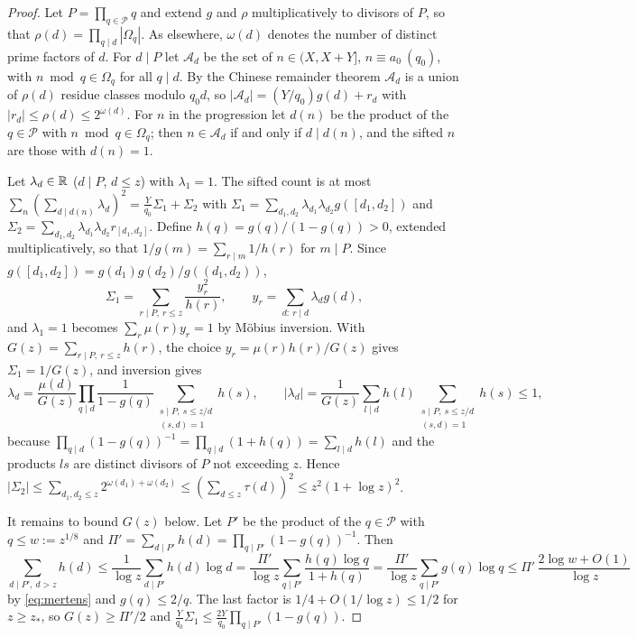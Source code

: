 \documentclass[11pt]{article}
\newcommand{\Pset}{\mathcal P}
\begin{document}
\begin{proof}
Let $P=\prod_{q\in\Pset}q$ and extend $g$ and $\rho$ multiplicatively to
divisors of $P$, so that $\rho(d)=\prod_{q\mid d}|\Omega_q|$. As elsewhere,
$\omega(d)$ denotes the number of distinct prime factors of $d$. For $d\mid P$ let $\mathcal A_d$ be the set of
$n\in(X,X+Y]$, $n\equiv a_0\ (q_0)$, with $n\bmod q\in\Omega_q$ for all $q\mid d$.
By the Chinese remainder theorem $\mathcal A_d$ is a union of $\rho(d)$
residue classes modulo $q_0d$, so $|\mathcal A_d|=(Y/q_0)g(d)+r_d$ with
$|r_d|\le\rho(d)\le2^{\omega(d)}$. For $n$ in the progression let $d(n)$ be the
product of the $q\in\Pset$ with $n\bmod q\in\Omega_q$; then $n\in\mathcal A_d$
if and only if $d\mid d(n)$, and the sifted $n$ are those with $d(n)=1$.

Let $\lambda_d\in\mathbb R$ ($d\mid P$, $d\le z$) with $\lambda_1=1$. The sifted count is
at most $\sum_n(\sum_{d\mid d(n)}\lambda_d)^2
=\frac{Y}{q_0}\Sigma_1+\Sigma_2$ with
$\Sigma_1=\sum_{d_1,d_2}\lambda_{d_1}\lambda_{d_2}g([d_1,d_2])$ and
$\Sigma_2=\sum_{d_1,d_2}\lambda_{d_1}\lambda_{d_2}r_{[d_1,d_2]}$.
Define $h(q)=g(q)/(1-g(q))>0$, extended multiplicatively, so that
$1/g(m)=\sum_{r\mid m}1/h(r)$ for $m\mid P$. Since
$g([d_1,d_2])=g(d_1)g(d_2)/g((d_1,d_2))$,
\[
\Sigma_1=\sum_{r\mid P,\ r\le z}\frac{y_r^2}{h(r)},\qquad
y_r=\sum_{d:\ r\mid d}\lambda_dg(d),
\]
and $\lambda_1=1$ becomes $\sum_r\mu(r)y_r=1$ by M\"obius inversion. With
$G(z)=\sum_{r\mid P,\ r\le z}h(r)$, the choice $y_r=\mu(r)h(r)/G(z)$ gives
$\Sigma_1=1/G(z)$, and inversion gives
\[
\lambda_d=\frac{\mu(d)}{G(z)}\prod_{q\mid d}\frac{1}{1-g(q)}
\sum_{\substack{s\mid P,\ s\le z/d\\ (s,d)=1}}h(s),\qquad
|\lambda_d|=\frac1{G(z)}\sum_{l\mid d}h(l)\sum_{\substack{s\mid P,\ s\le z/d\\(s,d)=1}}h(s)\le1,
\]
because $\prod_{q\mid d}(1-g(q))^{-1}=\prod_{q\mid d}(1+h(q))=\sum_{l\mid d}h(l)$
and the products $ls$ are distinct divisors of $P$ not exceeding $z$. Hence
$|\Sigma_2|\le\sum_{d_1,d_2\le z}2^{\omega(d_1)+\omega(d_2)}
\le(\sum_{d\le z}\tau(d))^2\le z^2(1+\log z)^2$.

It remains to bound $G(z)$ below. Let $P'$ be the product of the $q\in\Pset$
with $q\le w:=z^{1/8}$ and $\Pi'=\sum_{d\mid P'}h(d)=\prod_{q\mid P'}(1-g(q))^{-1}$.
Then
\[
\sum_{d\mid P',\ d>z}h(d)\le\frac1{\log z}\sum_{d\mid P'}h(d)\log d
=\frac{\Pi'}{\log z}\sum_{q\mid P'}\frac{h(q)\log q}{1+h(q)}
=\frac{\Pi'}{\log z}\sum_{q\mid P'}g(q)\log q
\le\Pi'\,\frac{2\log w+O(1)}{\log z}
\]
by \eqref{eq:mertens} and $g(q)\le2/q$. The last factor is $1/4+O(1/\log z)\le1/2$
for $z\ge z_*$, so $G(z)\ge\Pi'/2$ and $\frac{Y}{q_0}\Sigma_1\le\frac{2Y}{q_0}\prod_{q\mid P'}(1-g(q))$.
\end{proof}
\end{document}
